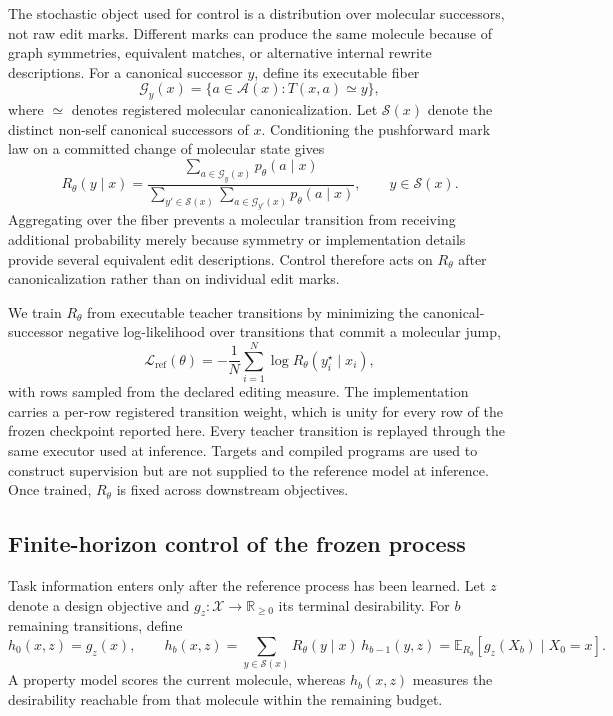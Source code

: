 The stochastic object used for control is a distribution over molecular
successors, not raw edit marks. Different marks can produce the same molecule
because of graph symmetries, equivalent matches, or alternative internal rewrite
descriptions. For a canonical successor $y$, define its executable fiber
\[
  \mathcal G_y(x)
  =
  \{a\in\mathcal A(x): T(x,a)\simeq y\},
\]
where $\simeq$ denotes registered molecular canonicalization. Let $\mathcal
S(x)$ denote the distinct non-self canonical successors of $x$. Conditioning the
pushforward mark law on a committed change of molecular state gives
\begin{equation}
  R_\theta(y\mid x)
  =
  \frac{
    \sum_{a\in\mathcal G_y(x)} p_\theta(a\mid x)
  }{
    \sum_{y'\in\mathcal S(x)}
    \sum_{a\in\mathcal G_{y'}(x)} p_\theta(a\mid x)
  },
  \qquad y\in\mathcal S(x).
  \label{eq:gem-rtheta}
\end{equation}
Aggregating over the fiber prevents a molecular transition from receiving
additional probability merely because symmetry or implementation details provide
several equivalent edit descriptions. Control therefore acts on $R_\theta$ after
canonicalization rather than on individual edit marks.

We train $R_\theta$ from executable teacher transitions by minimizing the
canonical-successor negative log-likelihood over transitions that commit a
molecular jump,
\begin{equation}
  \mathcal L_{\mathrm{ref}}(\theta)
  =
  -\frac{1}{N}\sum_{i=1}^{N}\log R_\theta(y_i^\star\mid x_i),
  \label{eq:gem-refloss}
\end{equation}
with rows sampled from the declared editing measure. The implementation carries a
per-row registered transition weight, which is unity for every row of the frozen
checkpoint reported here.
Every teacher transition is replayed through the same executor used at
inference. Targets and compiled programs are used to construct supervision but
are not supplied to the reference model at inference. Once trained, $R_\theta$ is
fixed across downstream objectives.

\subsection{Finite-horizon control of the frozen process}
\label{sec:gem-control}

Task information enters only after the reference process has been learned. Let
$z$ denote a design objective and $g_z:\mathcal X\rightarrow\mathbb R_{\geq0}$
its terminal desirability. For $b$ remaining transitions, define
\begin{equation}
  h_0(x,z)=g_z(x),
  \qquad
  h_b(x,z)
  =
  \sum_{y\in\mathcal S(x)} R_\theta(y\mid x)\, h_{b-1}(y,z)
  =
  \mathbb E_{R_\theta}\!\left[ g_z(X_b)\mid X_0=x \right].
  \label{eq:gem-backward}
\end{equation}
A property model scores the current molecule, whereas $h_b(x,z)$ measures the
desirability reachable from that molecule within the remaining budget.

